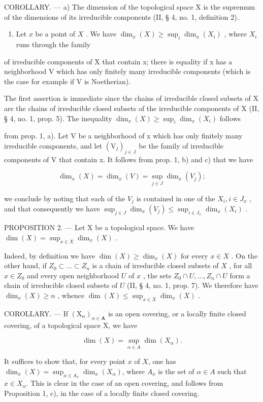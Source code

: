 COROLLARY. --- a) The dimension of the topological space X is the supremum of the dimensions of its irreducible components (II, § 4, no. 1, definition 2).

\begin{enumerate}
\def\labelenumi{\alph{enumi})}
\setcounter{enumi}{1}
\tightlist
\item
  Let \(x\) be a point of \(X\) . We have \(\dim_x(X) \geqslant \sup_i \dim_x(X_i)\) , where \(X_i\) runs through the family
\end{enumerate}
of irreducible components of X that contain x; there is equality if x has a neighborhood V which has only finitely many irreducible components (which is the case for example if V is Noetherian).


The first assertion is immediate since the chains of irreducible closed subsets of X are the chains of irreducible closed subsets of the irreducible components of X (II, § 4, no. 1, prop. 5). The inequality \(\dim_x(X) \geqslant \sup_i \dim_x(X_i)\) follows

from prop. 1, a). Let V be a neighborhood of x which has only finitely many irreducible components, and let \((\mathrm{V}_{j})_{j\in\mathbb{J}}\) be the family of irreducible components of V that contain x. It follows from prop. 1, b) and c) that we have

\[
\dim_ {x} (X) = \dim_ {x} (V) = \sup _ {j \in J} \dim_ {x} (V _ {j});
\]

we conclude by noting that each of the \(V_{j}\) is contained in one of the \(X_{i}, i \in J_{x}\) , and that consequently we have \(\sup_{j \in J} \dim_{x}(V_{j}) \leqslant \sup_{i \in J_{x}} \dim_{x}(X_{i})\) .

PROPOSITION 2. — Let X be a topological space. We have \(\dim(X) = \sup_{x \in X} \dim_x(X)\) .

Indeed, by definition we have \(\dim(X) \geqslant \dim_x(X)\) for every \(x \in X\) . On the other hand, if \(Z_0 \subset \ldots \subset Z_n\) is a chain of irreducible closed subsets of \(X\) , for all \(x \in Z_0\) and every open neighborhood \(U\) of \(x\) , the sets \(Z_0 \cap U, \ldots, Z_n \cap U\) form a chain of irreducible closed subsets of \(U\) (II, § 4, no. 1, prop. 7). We therefore have \(\dim_x(X) \geqslant n\) , whence \(\dim(X) \leqslant \sup_{x \in X} \dim_x(X)\) .

COROLLARY. — If \((\mathrm{X}_{\alpha})_{\alpha\in\mathbf{A}}\) is an open covering, or a locally finite closed covering, of a topological space X, we have

\[
\dim (X) = \sup _ {\alpha \in A} \dim (X _ {\alpha}).
\]

It suffices to show that, for every point \(x\) of \(X\), one has \(\dim_x(X) = \sup_{\alpha \in A_x} \dim_x(X_\alpha)\), where \(A_x\) is the set of \(\alpha \in A\) such that \(x \in X_\alpha\). This is clear in the case of an open covering, and follows from Proposition 1, c), in the case of a locally finite closed covering.

